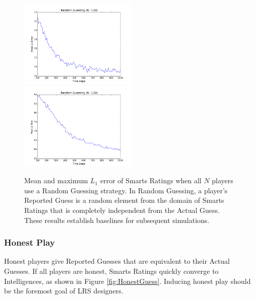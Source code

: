 \begin{figure}[h]
\centerline{%
\includegraphics[width=0.5\textwidth]{figures/robustness/Random_Guessing21.png}%
\includegraphics[width=0.5\textwidth] {figures/robustness/Random_Guessing22.png}%
}%
\caption{Mean and maximum $L_1$ error of Smarts Ratings when all $N$ players use a Random Guessing strategy. In Random Guessing, a player's Reported Guess is a random element from the domain of Smarts Ratings that is completely independent from the Actual Guess. These results establish baselines for subsequent simulations.}
\label{fig:RandomGuess}
\end{figure}

\subsubsection{Honest Play}

Honest players give Reported Guesses that are equivalent to their Actual Guesses. If all players are honest, Smarts Ratings quickly converge to Intelligences, as shown in Figure \ref{fig:HonestGuess}. Inducing honest play should be the foremost goal of LRS designers.

